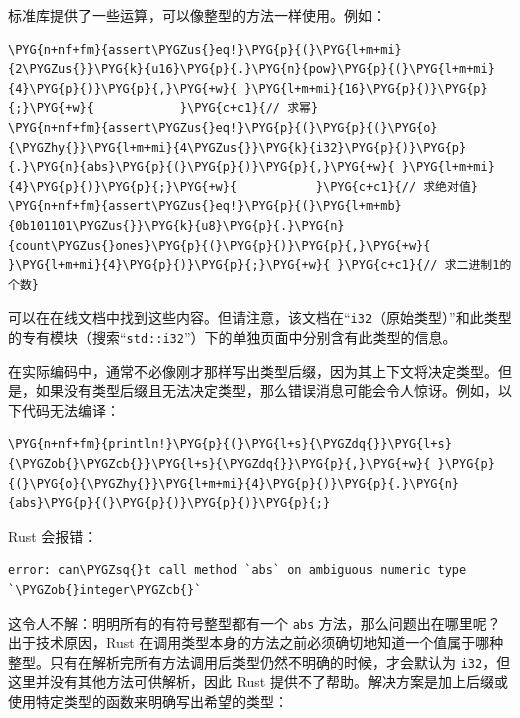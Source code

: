 标准库提供了一些运算，可以像整型的方法一样使用。例如：

\begin{Verbatim}[commandchars=\\\{\},breaklines=true,breakanywhere=true,fontsize=\codefont,xleftmargin=17bp]
\PYG{n+nf+fm}{assert\PYGZus{}eq!}\PYG{p}{(}\PYG{l+m+mi}{2\PYGZus{}}\PYG{k}{u16}\PYG{p}{.}\PYG{n}{pow}\PYG{p}{(}\PYG{l+m+mi}{4}\PYG{p}{)}\PYG{p}{,}\PYG{+w}{ }\PYG{l+m+mi}{16}\PYG{p}{)}\PYG{p}{;}\PYG{+w}{            }\PYG{c+c1}{// 求幂}
\PYG{n+nf+fm}{assert\PYGZus{}eq!}\PYG{p}{(}\PYG{p}{(}\PYG{o}{\PYGZhy{}}\PYG{l+m+mi}{4\PYGZus{}}\PYG{k}{i32}\PYG{p}{)}\PYG{p}{.}\PYG{n}{abs}\PYG{p}{(}\PYG{p}{)}\PYG{p}{,}\PYG{+w}{ }\PYG{l+m+mi}{4}\PYG{p}{)}\PYG{p}{;}\PYG{+w}{           }\PYG{c+c1}{// 求绝对值}
\PYG{n+nf+fm}{assert\PYGZus{}eq!}\PYG{p}{(}\PYG{l+m+mb}{0b101101\PYGZus{}}\PYG{k}{u8}\PYG{p}{.}\PYG{n}{count\PYGZus{}ones}\PYG{p}{(}\PYG{p}{)}\PYG{p}{,}\PYG{+w}{ }\PYG{l+m+mi}{4}\PYG{p}{)}\PYG{p}{;}\PYG{+w}{ }\PYG{c+c1}{// 求二进制1的个数}
\end{Verbatim}

可以在在线文档中找到这些内容。但请注意，该文档在“\texttt{i32}（原始类型）”和此类型的专有模块（搜索“\texttt{std::i32}”）下的单独页面中分别含有此类型的信息。

在实际编码中，通常不必像刚才那样写出类型后缀，因为其上下文将决定类型。但是，如果没有类型后缀且无法决定类型，那么错误消息可能会令人惊讶。例如，以下代码无法编译：

\begin{Verbatim}[commandchars=\\\{\},breaklines=true,breakanywhere=true,fontsize=\codefont,xleftmargin=17bp]
\PYG{n+nf+fm}{println!}\PYG{p}{(}\PYG{l+s}{\PYGZdq{}}\PYG{l+s}{\PYGZob{}\PYGZcb{}}\PYG{l+s}{\PYGZdq{}}\PYG{p}{,}\PYG{+w}{ }\PYG{p}{(}\PYG{o}{\PYGZhy{}}\PYG{l+m+mi}{4}\PYG{p}{)}\PYG{p}{.}\PYG{n}{abs}\PYG{p}{(}\PYG{p}{)}\PYG{p}{)}\PYG{p}{;}
\end{Verbatim}

Rust 会报错：

\begin{Verbatim}[commandchars=\\\{\},breaklines=true,breakanywhere=true,fontsize=\codefont,xleftmargin=17bp]
error: can\PYGZsq{}t call method `abs` on ambiguous numeric type `\PYGZob{}integer\PYGZcb{}`
\end{Verbatim}

这令人不解：明明所有的有符号整型都有一个 \texttt{abs} 方法，那么问题出在哪里呢？出于技术原因，Rust 在调用类型本身的方法之前必须确切地知道一个值属于哪种整型。只有在解析完所有方法调用后类型仍然不明确的时候，才会默认为 \texttt{i32}，但这里并没有其他方法可供解析，因此 Rust 提供不了帮助。解决方案是加上后缀或使用特定类型的函数来明确写出希望的类型：

